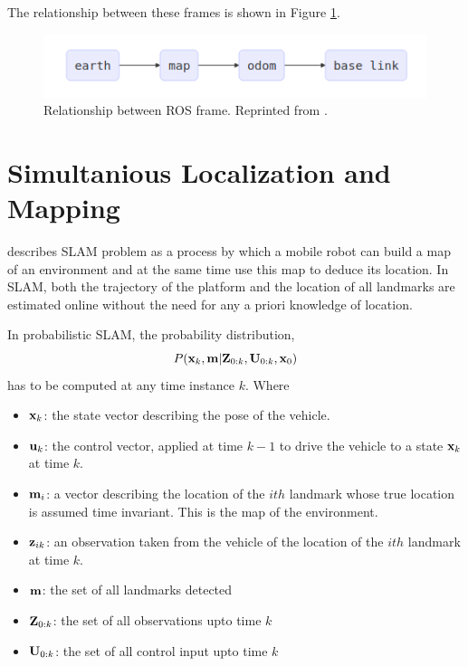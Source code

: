The relationship between these frames is shown in Figure \ref{fig:rosrefframes}.

\begin{figure}
	\centering
	\includegraphics[width=5in]{figures/ros_rel_frames}
	\caption[FAV of Antonomous Driving System.]{\small 
	Relationship between ROS frame. Reprinted from . }
	\label{fig:rosrefframes}
\end{figure}

\section{Simultanious Localization and Mapping}

 describes SLAM problem as a process by which a mobile robot can build a map of an environment and at the same time use this map to deduce its location. In SLAM, both the trajectory of the platform and the location of all landmarks are estimated online without the need for any a priori knowledge of location.

In probabilistic SLAM, the probability distribution, 
\begin{equation} \label{eq:slam1}
P({\bf x}_{k},{\bf m}\vert {\bf Z}_{0:k},{\bf U}_{0:k},{\bf x}_{0})
\end{equation}
has to be computed at any time instance $k$. Where
\begin{itemize}
	\item ${\bf x}_k$: the state vector describing the pose of the vehicle.
	
	\item ${\bf u}_k$: the control vector, applied at time $k - 1$ to drive the vehicle to a state ${\bf x}_k$ at time $k$.
	
	\item ${\bf m}_i$: a vector describing the location of the $ith$ landmark whose true location is assumed time invariant. This is the map of the environment.
	
	\item ${\bf z}_{ik}$: an observation taken from the vehicle of the location of the $ith$ landmark at time $k$.
	
	\item ${\bf m}$: the set of all landmarks detected
	
	\item ${\bf Z}_{0:k}$: the set of all observations upto time $k$
	
	\item ${\bf U}_{0:k}$: the set of all control input upto time $k$
	
\end{itemize}

